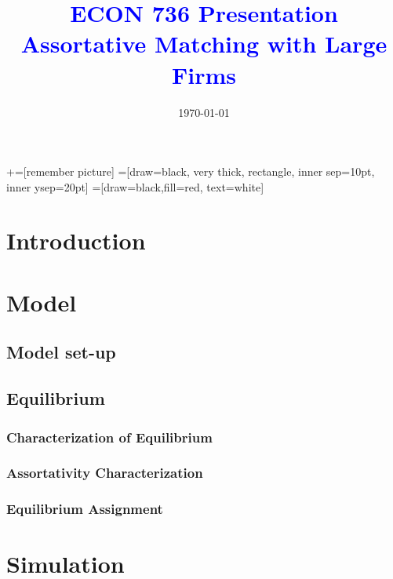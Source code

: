 \documentclass[notes,11pt, aspectratio=169]{beamer}
\title[]{\textcolor{blue}{ECON 736 Presentation \\ Assortative Matching with Large Firms}}
\author[MVB]{}
\institute[UW-Madison]{Mitchell Valdes-Bobes}
\date{\today}
\begin{document}
\newcommand\marktopleft[1]{%
    \tikz[overlay,remember picture] 
        \node (marker-#1-a) at (-.3em,.3em) {};%
}
\newcommand\markbottomright[2]{%
    \tikz[overlay,remember picture] 
        \node (marker-#1-b) at (0em,0em) {};%
}
+=[remember picture] 
 =[draw=black, very thick, rectangle, inner sep=10pt, inner ysep=20pt]
 =[draw=black,fill=red, text=white]

\begin{frame}
	\maketitle
\end{frame}


\section{Introduction}

\section{Model}
\subsection{Model set-up}
\subsection{Equilibrium}
\subsubsection{Characterization of Equilibrium}
\subsubsection{Assortativity Characterization}
\subsubsection{Equilibrium Assignment}

\section{Simulation}
\end{document}
